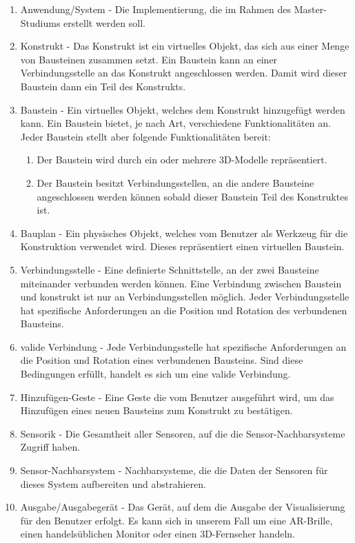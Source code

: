 \begin{enumerate}
	\item Anwendung/System - Die Implementierung, die im Rahmen des Master-Studiums erstellt werden soll.
	\item Konstrukt - Das Konstrukt ist ein virtuelles Objekt, das sich aus einer Menge von Bausteinen zusammen setzt. Ein Baustein kann an einer Verbindungsstelle an das Konstrukt angeschlossen werden. Damit wird dieser Baustein dann ein Teil des Konstrukts.
	\item \label{def:Baustein} Baustein - Ein virtuelles Objekt, welches dem Konstrukt hinzugefügt werden kann. Ein Baustein bietet, je nach Art, verschiedene Funktionalitäten an. Jeder Baustein stellt aber folgende Funktionalitäten bereit:
		\begin{enumerate}
			\item Der Baustein wird durch ein oder mehrere 3D-Modelle repräsentiert.
			\item Der Baustein besitzt Verbindungsstellen, an die andere Bausteine angeschlossen werden können sobald dieser Baustein Teil des Konstruktes ist.
		\end{enumerate}
	\item \label{def:Bauplan} Bauplan - Ein physisches Objekt, welches vom Benutzer als Werkzeug für die Konstruktion verwendet wird. Dieses repräsentiert einen virtuellen Baustein.
	\item Verbindungsstelle - Eine definierte Schnittstelle, an der zwei Bausteine miteinander verbunden werden können. Eine Verbindung zwischen Baustein und konstrukt ist nur an Verbindungsstellen möglich. Jeder Verbindungsstelle hat spezifische Anforderungen an die Position und Rotation des verbundenen Bausteins.
	\item valide Verbindung - Jede Verbindungsstelle hat spezifische Anforderungen an die Position und Rotation eines verbundenen Bausteins. Sind diese Bedingungen erfüllt, handelt es sich um eine valide Verbindung.
	\item Hinzufügen-Geste - Eine Geste die vom Benutzer ausgeführt wird, um das Hinzufügen eines neuen Bausteins zum Konstrukt zu bestätigen.
	\item Sensorik - Die Gesamtheit aller Sensoren, auf die die Sensor-Nachbarsysteme Zugriff haben.
	\item Sensor-Nachbarsystem - Nachbarsysteme, die die Daten der Sensoren für dieses System aufbereiten und abstrahieren.
	\item Ausgabe/Ausgabegerät - Das Gerät, auf dem die Ausgabe der Visualisierung für den Benutzer erfolgt. Es kann sich in unserem Fall um eine AR-Brille, einen handelsüblichen Monitor oder einen 3D-Fernseher handeln.
\end{enumerate}

